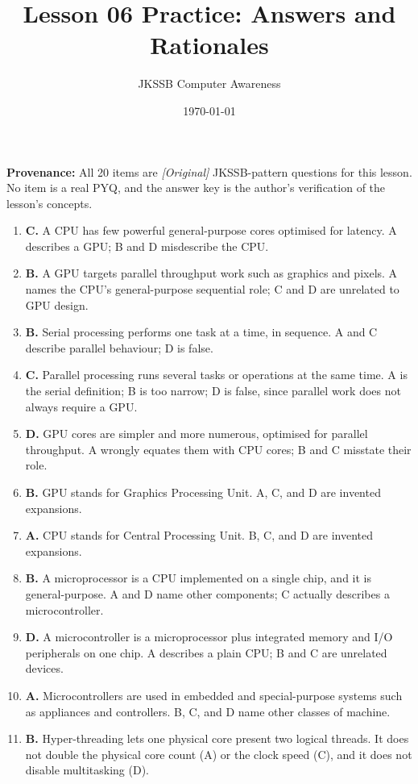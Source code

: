 \documentclass[11pt]{article}
\title{Lesson 06 Practice: Answers and Rationales}
\author{JKSSB Computer Awareness}
\date{\today}
\begin{document}
\maketitle
\noindent\textbf{Provenance:} All 20 items are \textit{[Original]}
JKSSB-pattern questions for this lesson. No item is a real PYQ, and the
answer key is the author's verification of the lesson's concepts.
\begin{enumerate}[label=\textbf{Q\arabic*.}, leftmargin=*]
\item \textbf{C.} A CPU has few powerful general-purpose cores optimised for
  latency. A describes a GPU; B and D misdescribe the CPU.
\item \textbf{B.} A GPU targets parallel throughput work such as graphics and
  pixels. A names the CPU's general-purpose sequential role; C and D are
  unrelated to GPU design.
\item \textbf{B.} Serial processing performs one task at a time, in sequence.
  A and C describe parallel behaviour; D is false.
\item \textbf{C.} Parallel processing runs several tasks or operations at the
  same time. A is the serial definition; B is too narrow; D is false, since
  parallel work does not always require a GPU.
\item \textbf{D.} GPU cores are simpler and more numerous, optimised for
  parallel throughput. A wrongly equates them with CPU cores; B and C
  misstate their role.
\item \textbf{B.} GPU stands for Graphics Processing Unit. A, C, and D are
  invented expansions.
\item \textbf{A.} CPU stands for Central Processing Unit. B, C, and D are
  invented expansions.
\item \textbf{B.} A microprocessor is a CPU implemented on a single chip, and
  it is general-purpose. A and D name other components; C actually describes
  a microcontroller.
\item \textbf{D.} A microcontroller is a microprocessor plus integrated memory
  and I/O peripherals on one chip. A describes a plain CPU; B and C are
  unrelated devices.
\item \textbf{A.} Microcontrollers are used in embedded and special-purpose
  systems such as appliances and controllers. B, C, and D name other classes
  of machine.
\item \textbf{B.} Hyper-threading lets one physical core present two logical
  threads. It does not double the physical core count (A) or the clock speed
  (C), and it does not disable multitasking (D).

\end{enumerate}
\end{document}
